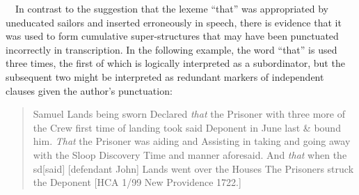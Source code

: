 \begin{styleStandard}
\ \ In contrast to the suggestion that the lexeme “that” was appropriated by uneducated sailors and inserted erroneously in speech, there is evidence that it was used to form cumulative super-structures that may have been punctuated incorrectly in transcription. In the following example, the word “that” is used three times, the first of which is logically interpreted as a subordinator, but the subsequent two might be interpreted as redundant markers of independent clauses given the author’s punctuation:
\end{styleStandard}


\begin{quotation}
Samuel Lands being sworn Declared \textit{that }the Prisoner with three more of the Crew first time of landing took said Deponent in June last \& bound him. \textit{That} the Prisoner was aiding and Assisting in taking and going away with the Sloop Discovery Time and manner aforesaid. And \textit{that}\textbf{ }when the sd[said] [defendant John] Lands went over the Houses The Prisoners struck the Deponent [HCA 1/99 New Providence 1722.] 

\end{quotation}
